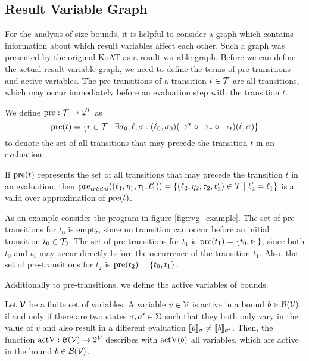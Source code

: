 \subsection{Result Variable Graph}

For the analysis of size bounds, it is helpful to consider a graph which contains information about which result variables affect each other.
Such a graph was presented by the original KoAT \cite{koat} as a result variable graph.
Before we can define the actual result variable graph, we need to define the terms of pre-transitions and active variables.
The pre-transitions of a transition $t \in \mathcal{T}$ are all transitions, which may occur immediately before an evaluation step with the transition $t$.

\begin{definition} 
  We define $\text{pre}: \mathcal{T} \rightarrow 2^{\mathcal{T}}$ as
  \[\text{pre}(t) = \lbrace r \in \mathcal{T} \mid \exists \sigma_0, \ell, \sigma: (\ell_0, \sigma_0) (\rightarrow^* \circ \rightarrow_r \circ \rightarrow_{t}) (\ell, \sigma) \rbrace\]
  to denote the set of all transitions that may precede the transition $t$ in an evaluation.	
\end{definition}

If $\text{pre}(t)$ represents the set of all transitions that may precede the transition $t$ in an evaluation, then $\text{pre}_{\mathit{trivial}}((\ell_1, \eta_1, \tau_1, \ell_1')) = \lbrace (\ell_2, \eta_2, \tau_2, \ell_2') \in \mathcal{T} \mid \ell_2' = \ell_1 \rbrace$ is a valid over approximation of $\text{pre}(t)$.



As an example consider the program in figure \ref{fig:rvg_example}.
The set of pre-transitions for $t_0$ is empty, since no transition can occur before an initial transition $t_0 \in \mathcal{T}_0$.
The set of pre-transitions for $t_1$ is $\text{pre}(t_1) = \lbrace t_0, t_1 \rbrace$, since both $t_0$ and $t_1$ may occur directly before the occurrence of the transition $t_1$.
Also, the set of pre-transitions for $t_2$ is $\text{pre}(t_2) = \lbrace t_0, t_1 \rbrace$.

Additionally to pre-transitions, we define the active variables of bounds. 

\begin{definition}
  Let $\mathcal{V}$ be a finite set of variables.  
  A variable $v \in \mathcal{V}$ is active in a bound $b \in \mathcal{B}(\mathcal{V})$ if and only if there are two states $\sigma, \sigma' \in \Sigma$ such that they both only vary in the value of $v$ and also result in a different evaluation $\llbracket b \rrbracket_{\sigma} \neq \llbracket b \rrbracket_{\sigma'}$.
  Then, the function $\text{actV}: \mathcal{B}(\mathcal{V}) \rightarrow 2^{\mathcal{V}}$ describes with $\text{actV}(b)$ all variables, which are active in the bound $b \in \mathcal{B}(\mathcal{V})$.
\end{definition}

